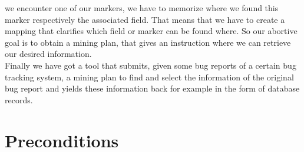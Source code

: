 we encounter one of our markers, we have to memorize where we found this marker respectively the associated field. That means that we have to create a mapping that clarifies which field or marker can be found where. So our abortive goal is to obtain a mining plan, that gives an instruction where we can retrieve our desired information. \\  Finally we have got a tool that submits, given some bug reports of a certain bug tracking system, a mining plan to find and select the information of the original bug report and yields these information back for example in the form of database records. 

\section{Preconditions}
\label{Preconditions}

